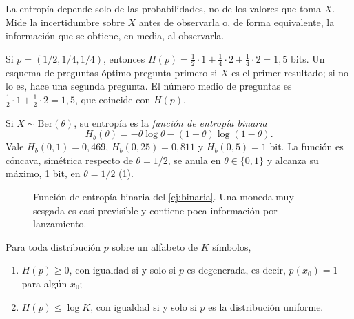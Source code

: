 La entropía depende solo de las probabilidades, no de los valores que toma $X$. Mide la incertidumbre sobre $X$ antes de observarla o, de forma equivalente, la información que se obtiene, en media, al observarla.

\begin{ejemplo}\label{ej:entropia-tres}
Si $p=(1/2,1/4,1/4)$, entonces $H(p)=\tfrac12\cdot 1+\tfrac14\cdot 2+\tfrac14\cdot 2=1{,}5$ bits. Un esquema de preguntas óptimo pregunta primero si $X$ es el primer resultado; si no lo es, hace una segunda pregunta. El número medio de preguntas es $\tfrac12\cdot 1+\tfrac12\cdot 2=1{,}5$, que coincide con $H(p)$.
\end{ejemplo}

\begin{ejemplo}\label{ej:binaria}
Si $X\sim\mathrm{Ber}(\theta)$, su entropía es la \emph{función de entropía binaria}
\[
H_b(\theta)=-\theta\log\theta-(1-\theta)\log(1-\theta).
\]
Vale $H_b(0{,}1)=0{,}469$, $H_b(0{,}25)=0{,}811$ y $H_b(0{,}5)=1$ bit. La función es cóncava, simétrica respecto de $\theta=1/2$, se anula en $\theta\in\{0,1\}$ y alcanza su máximo, 1 bit, en $\theta=1/2$ (\cref{fig:binaria}).
\end{ejemplo}

\begin{figure}[h]
\centering
{}
\caption{Función de entropía binaria del \cref{ej:binaria}. Una moneda muy sesgada es casi previsible y contiene poca información por lanzamiento.}
\label{fig:binaria}
\end{figure}

\begin{proposicion}\label{prop:cotas-entropia}
Para toda distribución $p$ sobre un alfabeto de $K$ símbolos,
\begin{enumerate}
  \item $H(p)\ge 0$, con igualdad si y solo si $p$ es degenerada, es decir, $p(x_0)=1$ para algún $x_0$;
  \item $H(p)\le\log K$, con igualdad si y solo si $p$ es la distribución uniforme.
\end{enumerate}
\end{proposicion}


